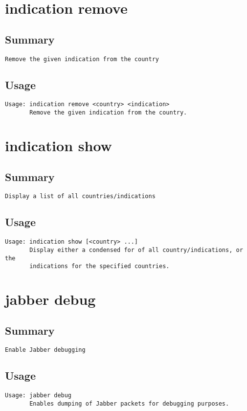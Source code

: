 \section{indication remove}
\subsection{Summary}
\begin{verbatim}
Remove the given indication from the country
\end{verbatim}
\subsection{Usage}
\begin{verbatim}
Usage: indication remove <country> <indication>
       Remove the given indication from the country.

\end{verbatim}


\section{indication show}
\subsection{Summary}
\begin{verbatim}
Display a list of all countries/indications
\end{verbatim}
\subsection{Usage}
\begin{verbatim}
Usage: indication show [<country> ...]
       Display either a condensed for of all country/indications, or the
       indications for the specified countries.

\end{verbatim}


\section{jabber debug}
\subsection{Summary}
\begin{verbatim}
Enable Jabber debugging
\end{verbatim}
\subsection{Usage}
\begin{verbatim}
Usage: jabber debug
       Enables dumping of Jabber packets for debugging purposes.

\end{verbatim}


